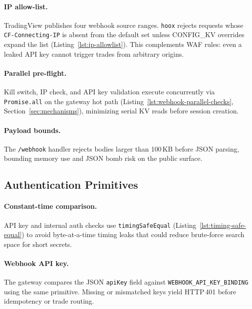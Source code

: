
\paragraph{IP allow-list.} TradingView publishes four webhook source ranges. \texttt{hoox} rejects requests whose \texttt{CF-Connecting-IP} is absent from the default set unless CONFIG\_KV overrides expand the list (Listing~\ref{lst:ip-allowlist}). This complements WAF rules: even a leaked API key cannot trigger trades from arbitrary origins.


\paragraph{Parallel pre-flight.} Kill switch, IP check, and API key validation execute concurrently via \texttt{Promise.all} on the gateway hot path (Listing~\ref{lst:webhook-parallel-checks}, Section~\ref{sec:mechanisms}), minimizing serial KV reads before session creation.

\paragraph{Payload bounds.} The \texttt{/webhook} handler rejects bodies larger than 100\,KB before JSON parsing, bounding memory use and JSON bomb risk on the public surface.

\subsection{Authentication Primitives}

\paragraph{Constant-time comparison.} API key and internal auth checks use \texttt{timingSafeEqual} (Listing~\ref{lst:timing-safe-equal}) to avoid byte-at-a-time timing leaks that could reduce brute-force search space for short secrets.


\paragraph{Webhook API key.} The gateway compares the JSON \texttt{apiKey} field against \texttt{WEBHOOK\_API\_KEY\_BINDING} using the same primitive. Missing or mismatched keys yield HTTP\,401 before idempotency or trade routing.


